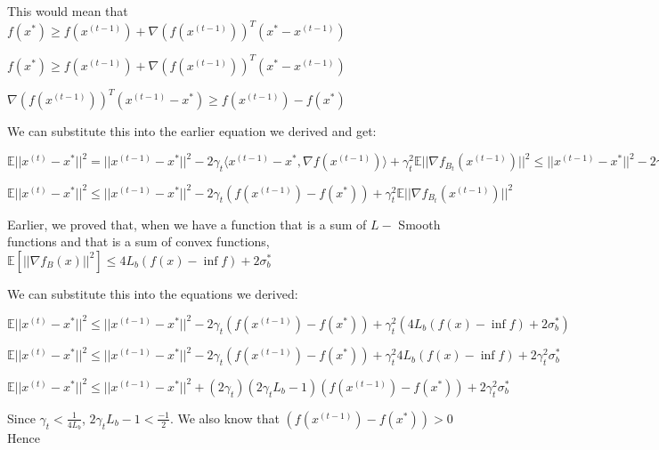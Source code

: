 This would mean that $f(x^*) \geq f(x^{(t - 1)}) + \nabla(f(x^{(t - 1)}))^T (x^* - x^{(t - 1)})$ \newline 


$f(x^*) \geq f(x^{(t - 1)}) + \nabla(f(x^{(t - 1)}))^T (x^* - x^{(t - 1)})$ \newline 


$\nabla(f(x^{(t - 1)}))^T (x^{(t - 1)} - x^*) \geq f(x^{(t - 1)}) - f(x^*)$ \newline 

We can substitute this into the earlier equation we derived and get: \newline 

$\mathbb{E}||x^{(t)} - x^*||^2 = ||x^{(t - 1)} - x^*||^2 - 2\gamma_t \langle x^{(t - 1)} - x^*,  \nabla f(x^{(t - 1)})\rangle + \gamma_t^2 \mathbb{E}||\nabla f_{B_t}(x^{(t - 1)})||^2 \leq ||x^{(t - 1)} - x^*||^2 - 2\gamma_t (f(x^{(t - 1)}) - f(x^*)) + \gamma_t^2 \mathbb{E}||\nabla f_{B_t}(x^{(t - 1)})||^2$ \newline 

$\mathbb{E}||x^{(t)} - x^*||^2 \leq ||x^{(t - 1)} - x^*||^2 - 2\gamma_t (f(x^{(t - 1)}) - f(x^*)) + \gamma_t^2 \mathbb{E}||\nabla f_{B_t}(x^{(t - 1)})||^2$ \newline 


Earlier, we proved that, when we have a function that is a sum of $L-$ Smooth functions and that is a sum of convex functions, $\mathbb{E}[||\nabla f_B(x)||^2] \leq 4L_{b} (f(x) - \inf f) + 2 \sigma_b^*$ \newline 

We can substitute this into the equations we derived: \newline 

$\mathbb{E}||x^{(t)} - x^*||^2 \leq ||x^{(t - 1)} - x^*||^2 - 2\gamma_t (f(x^{(t - 1)}) - f(x^*)) + \gamma_t^2 (4L_{b} (f(x) - \inf f) + 2 \sigma_b^*) $ \newline 

$\mathbb{E}||x^{(t)} - x^*||^2 \leq ||x^{(t - 1)} - x^*||^2 - 2\gamma_t (f(x^{(t - 1)}) - f(x^*)) + \gamma_t^2 4L_{b} (f(x) - \inf f) + 2\gamma_t^2 \sigma_b^* $ \newline 

$\mathbb{E}||x^{(t)} - x^*||^2 \leq ||x^{(t - 1)} - x^*||^2 + (2 \gamma_t) (2 \gamma_t L_{b} - 1)(f(x^{(t - 1)}) - f(x^*)) + 2\gamma_t^2 \sigma_b^* $ \newline 

Since $\gamma_t < \frac{1}{4L_{b}}$, $2\gamma_t L_{b} - 1 < \frac{-1}{2}$. We also know that $(f(x^{(t - 1)}) - f(x^*)) > 0$ Hence \newline 

